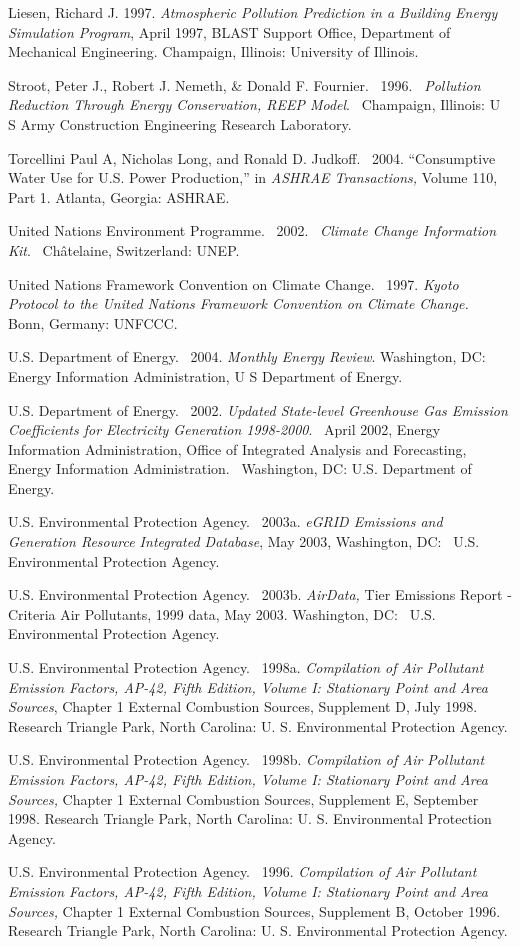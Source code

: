 Liesen, Richard J. 1997. \emph{Atmospheric Pollution Prediction in a Building Energy Simulation Program}, April 1997, BLAST Support Office, Department of Mechanical Engineering. Champaign, Illinois: University of Illinois.

Stroot, Peter J., Robert J. Nemeth, \& Donald F. Fournier.~ 1996.~ \emph{Pollution Reduction Through Energy Conservation, REEP Model}.~ Champaign, Illinois: U S Army Construction Engineering Research Laboratory.

Torcellini Paul A, Nicholas Long, and Ronald D. Judkoff.~ 2004. ``Consumptive Water Use for U.S. Power Production,'' in \emph{ASHRAE Transactions,} Volume 110, Part 1. Atlanta, Georgia: ASHRAE.

United Nations Environment Programme.~ 2002.~ \emph{Climate Change Information Kit}.~ Châtelaine, Switzerland: UNEP.

United Nations Framework Convention on Climate Change.~ 1997. \emph{Kyoto} \emph{Protocol to the United Nations Framework Convention on Climate Change.}~ Bonn, Germany: UNFCCC.

U.S. Department of Energy.~ 2004. \emph{Monthly Energy Review}. Washington, DC:~ Energy Information Administration, U S Department of Energy.

U.S. Department of Energy.~ 2002. \emph{Updated State-level Greenhouse Gas Emission Coefficients for Electricity Generation 1998-2000}.~ April 2002, Energy Information Administration, Office of Integrated Analysis and Forecasting, Energy Information Administration.~ Washington, DC: U.S. Department of Energy.

U.S. Environmental Protection Agency.~ 2003a. \emph{eGRID Emissions and Generation Resource Integrated Database}, May 2003, Washington, DC:~ U.S. Environmental Protection Agency.

U.S. Environmental Protection Agency.~ 2003b. \emph{AirData,} Tier Emissions Report - Criteria Air Pollutants, 1999 data, May 2003. Washington, DC:~ U.S. Environmental Protection Agency.

U.S. Environmental Protection Agency.~ 1998a. \emph{Compilation of Air Pollutant Emission Factors, AP-42, Fifth Edition, Volume I: Stationary Point and Area Sources}, Chapter 1 External Combustion Sources, Supplement D, July 1998. Research Triangle Park, North Carolina: U. S. Environmental Protection Agency.

U.S. Environmental Protection Agency.~ 1998b. \emph{Compilation of Air Pollutant Emission Factors, AP-42, Fifth Edition, Volume I: Stationary Point and Area Sources,} Chapter 1 External Combustion Sources, Supplement E, September 1998. Research Triangle Park, North Carolina: U. S. Environmental Protection Agency.

U.S. Environmental Protection Agency.~ 1996. \emph{Compilation of Air Pollutant Emission Factors, AP-42, Fifth Edition, Volume I: Stationary Point and Area Sources,} Chapter 1 External Combustion Sources, Supplement B, October 1996. Research Triangle Park, North Carolina: U. S. Environmental Protection Agency.
